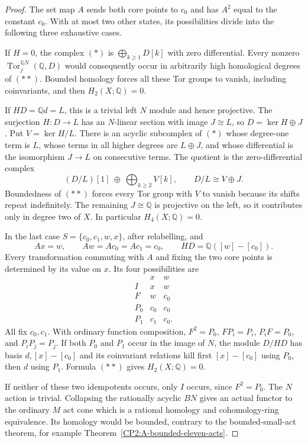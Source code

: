 \begin{proof}
The set map $A$ sends both core points to $c_0$ and has
$A^2$ equal to the constant $c_0$. With at most two other
states, its possibilities divide into the following three
exhaustive cases.

If $H=0$, the complex $(*)$ is
$\bigoplus_{k\ge1}D[k]$ with zero differential.
Every nonzero $\operatorname{Tor}^{\mathbb QN}_j(\mathbb Q,D)$
would consequently occur in arbitrarily high homological
degrees of $(**)$. Bounded homology forces all these Tor
groups to vanish, including coinvariants, and then
$H_2(X;\mathbb Q)=0$.

If $HD=\mathbb Qd=L$, this is a trivial left $N$ module
and hence projective. The surjection $H:D\to L$ has an
$N$-linear section with image $J\cong L$, so
$D=\ker H\oplus J$. Put $V=\ker H/L$.
There is an acyclic subcomplex of $(*)$ whose degree-one
term is $L$, whose terms in all higher degrees are
$L\oplus J$, and whose differential is the isomorphism
$J\to L$ on consecutive terms. The quotient is the
zero-differential complex
\[
 (D/L)[1]\ \oplus\ \bigoplus_{k\ge2}V[k],
 \qquad D/L\cong V\oplus J.
\]
Boundedness of $(**)$ forces every Tor group with $V$
to vanish because its shifts repeat indefinitely.
The remaining $J\cong\mathbb Q$ is projective on the
left, so it contributes only in degree two of $X$.
In particular $H_4(X;\mathbb Q)=0$.

In the last case $S=\{c_0,c_1,w,x\}$, after relabelling,
and
\[
 Ax=w,\qquad Aw=Ac_0=Ac_1=c_0,
 \qquad HD=\mathbb Q([w]-[c_0]).
\]
Every transformation commuting with $A$ and fixing the
two core points is determined by its value on $x$.
Its four possibilities are
\[
\begin{array}{c|cc}
 &x&w\\\hline
 I&x&w\\
 F&w&c_0\\
 P_0&c_0&c_0\\
 P_1&c_1&c_0.
\end{array}
\]
All fix $c_0,c_1$. With ordinary function composition,
$F^2=P_0$, $FP_i=P_i$, $P_iF=P_0$, and $P_iP_j=P_j$.
If both $P_0$ and $P_1$ occur in the image of $N$, the
module $D/HD$ has basis $d,[x]-[c_0]$ and its coinvariant
relations kill first $[x]-[c_0]$ using $P_0$, then $d$
using $P_1$. Formula $(**)$ gives $H_2(X;\mathbb Q)=0$.

If neither of these two idempotents occurs, only $I$
occurs, since $F^2=P_0$. The $N$ action is trivial.
Collapsing the rationally acyclic $BN$ gives an actual
functor to the ordinary $M$ act cone which is a rational
homology and cohomology-ring equivalence. Its homology
would be bounded, contrary to the bounded-small-act
theorem, for example
Theorem~\ref{CP2:A-bounded-eleven-acts}.


\end{proof}
